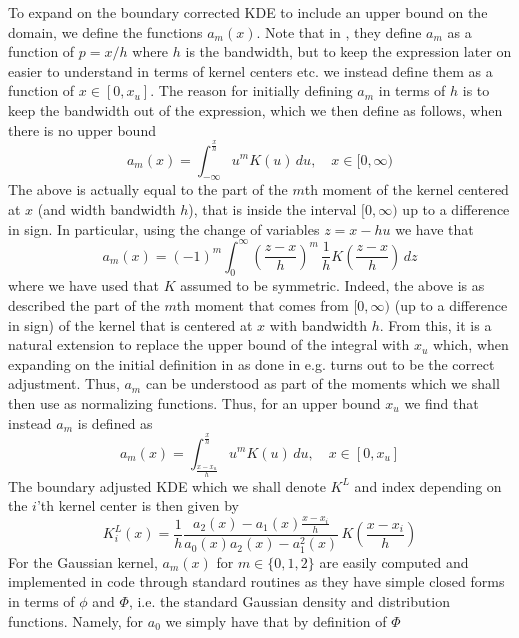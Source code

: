 \documentclass[../Thesis.tex]{subfiles}
\begin{document}
To expand on the boundary corrected KDE to include an upper bound on the domain, we define the functions $a_m\left(x\right)$. Note that in \cite{Jones1993SimpleBC}, they define $a_m$ as a function of $p = x / h$ where $h$ is the bandwidth, but to keep the expression later on easier to understand in terms of kernel centers etc. we instead define them as a function of $x \in [0,x_u]$. The reason for initially defining $a_m$ in terms of $h$ is to keep the bandwidth out of the expression, which we then define as follows, when there is no upper bound
$$a_m\left(x\right) = \int_{-\infty}^{\frac{x}{h}} u^m K\left(u\right) \, du, \quad x\in [0,\infty)$$
The above is actually equal to the part of the $m$th moment of the kernel centered at $x$ (and width bandwidth $h$), that is inside the interval $[0,\infty)$ up to a difference in sign. In particular, using the change of variables $z=x-hu$ we have that
$$a_m\left(x\right) = \left(-1\right)^m  \int_{0}^{\infty} \left(\frac{z-x}{h}\right)^m \, \frac{1}{h}K\left(\frac{z-x}{h}\right) \, dz$$
where we have used that $K$ assumed to be symmetric. Indeed, the above is as described the part of the $m$th moment that comes from $[0,\infty)$ (up to a difference in sign) of the kernel that is centered at $x$ with bandwidth $h$. From this, it is a natural extension to replace the upper bound of the integral with $x_u$ which, when expanding on the initial definition in \cite{Jones1993SimpleBC} as done in e.g.
\cite{Simple_and_eff_boundary_correction_for_kern_densities}
turns out to be the correct adjustment. Thus, $a_m$ can be understood as part of the moments which we shall then use as normalizing functions. Thus, for an upper bound $x_u$ we find that instead $a_m$ is defined as
$$a_m\left(x\right) = \int_{\frac{x-x_u}{h}}^{\frac{x}{h}} u^m K\left(u\right)\, du, \quad x\in [0,x_u]$$
The boundary adjusted KDE which we shall denote $K^L$ and index depending on the $i$'th kernel center is then given by
\begin{equation}\label{eq:jones bc corrected kernel}
    K_i^{L} \left(x\right) = \frac{1}{h}\frac{a_2\left(x\right) - a_1\left(x\right) \frac{x - x_i}{h}}{a_0 \left(x\right) a_2\left(x\right) - a_1^2 \left(x\right) } \, K\left(\frac{x - x_i}{h}\right)
\end{equation}
For the Gaussian kernel, $a_m\left(x\right)$ for $m \in \{0,1,2\}$ are easily computed and implemented in code through standard routines as they have simple closed forms in terms of $\phi$ and $\Phi$, i.e. the standard Gaussian density and distribution functions. Namely, for $a_0$ we simply have that by definition of $\Phi$
\end{document}
